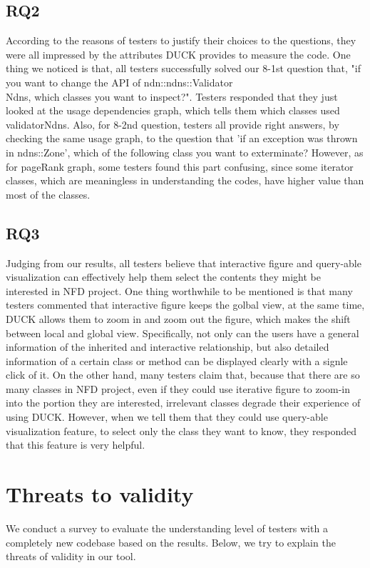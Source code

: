 \documentclass{sig-alternate}
\begin{document}
\subsection{RQ2}
According to the reasons of testers to justify their choices to the questions, they were all impressed by the attributes DUCK provides to measure the code. One thing we noticed is that, all testers successfully solved our 8-1st question that, "if you want to change the API of ndn::ndns::Validator\\Ndns, which classes you want to inspect?". Testers responded
that they just looked at the usage dependencies graph, which tells them which classes used validatorNdns. Also, for 8-2nd question, testers all provide right answers, by checking the same usage graph, to the question that 'if an exception was thrown in ndns::Zone', which of the following class you want to exterminate? However, as for pageRank graph, some testers found this part confusing, since some iterator classes, which are meaningless in understanding the codes, have higher value than most of the classes.


\subsection{RQ3}
Judging from our results, all testers believe that interactive figure and query-able visualization can effectively help them select the contents they might be interested in NFD project. One thing worthwhile to be mentioned is that many testers commented that interactive figure keeps the golbal view, at the same time, DUCK allows them to zoom in and zoom out the figure, which makes the shift between local and global view. Specifically, not only can the users have a general information of the inherited and interactive relationship, but also detailed information of a certain class or method can be displayed clearly with a signle click of it. On the other hand, many
testers claim that, because that there are so many classes in NFD project, even if they could use iterative figure to zoom-in into the portion they are interested, irrelevant classes degrade their experience of using DUCK. However, when we tell them that they could use query-able visualization feature, to select only the class they want to know, they responded that this feature is very helpful.  


\section{Threats to validity}
We conduct a survey to evaluate the understanding level of testers with a completely new codebase based on the results. Below, we try to explain the threats of validity in our tool.
\end{document}
